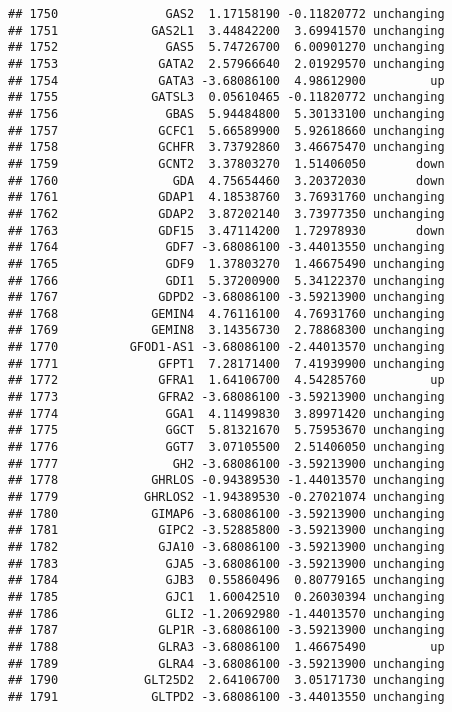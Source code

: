 \documentclass[]{article}
\begin{document}
\begin{verbatim}
## 1750               GAS2  1.17158190 -0.11820772 unchanging
## 1751             GAS2L1  3.44842200  3.69941570 unchanging
## 1752               GAS5  5.74726700  6.00901270 unchanging
## 1753              GATA2  2.57966640  2.01929570 unchanging
## 1754              GATA3 -3.68086100  4.98612900         up
## 1755             GATSL3  0.05610465 -0.11820772 unchanging
## 1756               GBAS  5.94484800  5.30133100 unchanging
## 1757              GCFC1  5.66589900  5.92618660 unchanging
## 1758              GCHFR  3.73792860  3.46675470 unchanging
## 1759              GCNT2  3.37803270  1.51406050       down
## 1760                GDA  4.75654460  3.20372030       down
## 1761              GDAP1  4.18538760  3.76931760 unchanging
## 1762              GDAP2  3.87202140  3.73977350 unchanging
## 1763              GDF15  3.47114200  1.72978930       down
## 1764               GDF7 -3.68086100 -3.44013550 unchanging
## 1765               GDF9  1.37803270  1.46675490 unchanging
## 1766               GDI1  5.37200900  5.34122370 unchanging
## 1767              GDPD2 -3.68086100 -3.59213900 unchanging
## 1768             GEMIN4  4.76116100  4.76931760 unchanging
## 1769             GEMIN8  3.14356730  2.78868300 unchanging
## 1770          GFOD1-AS1 -3.68086100 -2.44013570 unchanging
## 1771              GFPT1  7.28171400  7.41939900 unchanging
## 1772              GFRA1  1.64106700  4.54285760         up
## 1773              GFRA2 -3.68086100 -3.59213900 unchanging
## 1774               GGA1  4.11499830  3.89971420 unchanging
## 1775               GGCT  5.81321670  5.75953670 unchanging
## 1776               GGT7  3.07105500  2.51406050 unchanging
## 1777                GH2 -3.68086100 -3.59213900 unchanging
## 1778             GHRLOS -0.94389530 -1.44013570 unchanging
## 1779            GHRLOS2 -1.94389530 -0.27021074 unchanging
## 1780             GIMAP6 -3.68086100 -3.59213900 unchanging
## 1781              GIPC2 -3.52885800 -3.59213900 unchanging
## 1782              GJA10 -3.68086100 -3.59213900 unchanging
## 1783               GJA5 -3.68086100 -3.59213900 unchanging
## 1784               GJB3  0.55860496  0.80779165 unchanging
## 1785               GJC1  1.60042510  0.26030394 unchanging
## 1786               GLI2 -1.20692980 -1.44013570 unchanging
## 1787              GLP1R -3.68086100 -3.59213900 unchanging
## 1788              GLRA3 -3.68086100  1.46675490         up
## 1789              GLRA4 -3.68086100 -3.59213900 unchanging
## 1790            GLT25D2  2.64106700  3.05171730 unchanging
## 1791             GLTPD2 -3.68086100 -3.44013550 unchanging

\end{verbatim}
\end{document}
